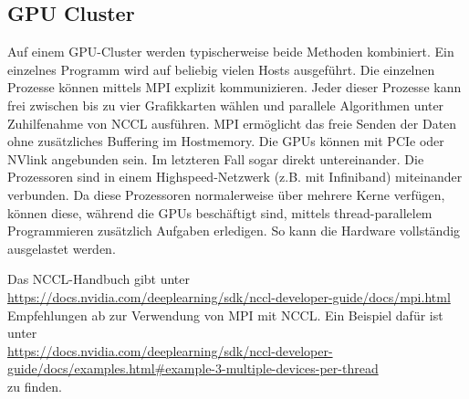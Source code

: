     	\subsection{GPU Cluster}
    	Auf einem GPU-Cluster werden typischerweise beide Methoden kombiniert. Ein einzelnes Programm wird auf beliebig vielen Hosts ausgeführt. Die einzelnen Prozesse können mittels MPI explizit kommunizieren. Jeder dieser Prozesse kann frei zwischen bis zu vier Grafikkarten wählen und parallele Algorithmen unter Zuhilfenahme von NCCL ausführen. MPI ermöglicht das freie Senden der Daten ohne zusätzliches Buffering im Hostmemory. Die GPUs können mit PCIe oder NVlink angebunden sein. Im letzteren Fall sogar direkt untereinander. Die Prozessoren sind in einem Highspeed-Netzwerk (z.B. mit Infiniband) miteinander verbunden. Da diese Prozessoren normalerweise über mehrere Kerne verfügen, können diese, während die GPUs beschäftigt sind, mittels thread-parallelem Programmieren zusätzlich Aufgaben erledigen. So kann die Hardware vollständig ausgelastet werden.
    	
    	Das NCCL-Handbuch gibt unter\\ 
    	\url{https://docs.nvidia.com/deeplearning/sdk/nccl-developer-guide/docs/mpi.html} \\
    	Empfehlungen ab zur Verwendung von MPI mit NCCL. Ein Beispiel dafür ist unter \\
    	\url{https://docs.nvidia.com/deeplearning/sdk/nccl-developer-guide/docs/examples.html#example-3-multiple-devices-per-thread} \\
    	zu finden.